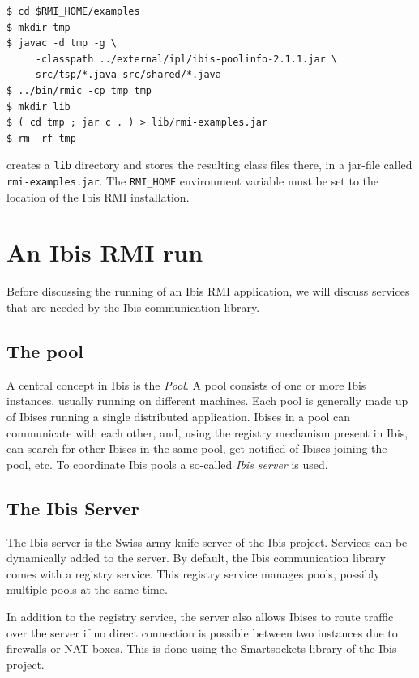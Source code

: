\documentclass[a4paper,10pt]{article}
\begin{document}
\begin{verbatim}
$ cd $RMI_HOME/examples
$ mkdir tmp
$ javac -d tmp -g \
     -classpath ../external/ipl/ibis-poolinfo-2.1.1.jar \
     src/tsp/*.java src/shared/*.java
$ ../bin/rmic -cp tmp tmp
$ mkdir lib
$ ( cd tmp ; jar c . ) > lib/rmi-examples.jar
$ rm -rf tmp
\end{verbatim}

creates a \texttt{lib} directory and stores the resulting class files there,
in a jar-file called \texttt{rmi-examples.jar}.
The \texttt{RMI\_HOME} environment variable must be set to the location of
the Ibis RMI installation.

\section{An Ibis RMI run}

Before discussing
the running of an Ibis RMI application, we will discuss services that are
needed by the Ibis communication library.

\subsection{The pool}

A central concept in Ibis is the \emph{Pool}. A pool consists of one or
more Ibis instances, usually running on different machines. Each pool is
generally made up of Ibises running a single distributed application.
Ibises in a pool can communicate with each other, and, using the
registry mechanism present in Ibis, can search for other Ibises in the
same pool, get notified of Ibises joining the pool, etc. To
coordinate Ibis pools a so-called \emph{Ibis server} is used.

\subsection{The Ibis Server}

The Ibis server is the Swiss-army-knife server of the Ibis project.
Services can be dynamically added to the server. By default, the Ibis
communication library comes with a registry service. This registry
service manages pools, possibly multiple pools at the same time.

In addition to the registry service, the server also allows
Ibises to route traffic over the server if no direct connection is
possible between two instances due to firewalls or NAT boxes. This is
done using the Smartsockets library of the Ibis project.
\end{document}
